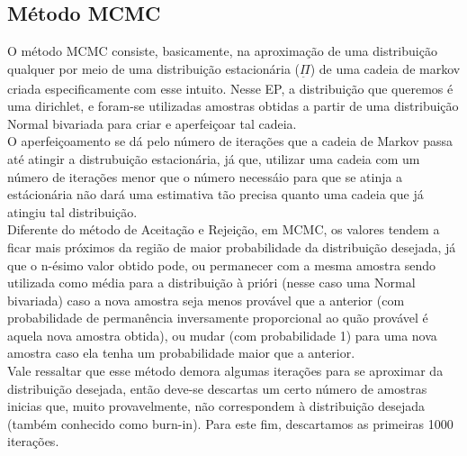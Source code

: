 \documentclass{article}
\newcommand{\undertilde}[1]{\underset{\widetilde{}}{#1}}
\begin{document}
\subsection{Método MCMC}

    O método MCMC consiste, basicamente, na aproximação de uma distribuição qualquer por meio de uma distribuição estacionária (\textbf{$\undertilde{\Pi}$}) de uma cadeia de markov criada especificamente com esse intuito. Nesse EP, a distribuição que queremos é uma dirichlet, e foram-se utilizadas amostras obtidas a partir de uma distribuição Normal bivariada para criar e aperfeiçoar tal cadeia.\\
    
    O aperfeiçoamento se dá pelo número de iterações que a cadeia de Markov passa até atingir a distrubuição estacionária, já que, utilizar uma cadeia com um número de iterações menor que o número necessáio para que se atinja a estácionária não dará uma estimativa tão precisa quanto uma cadeia que já atingiu tal distribuição.\\
    
    Diferente do método de Aceitação e Rejeição, em MCMC, os valores tendem a ficar mais próximos da região de maior probabilidade da distribuição desejada, já que o n-ésimo valor obtido pode, ou permanecer com a mesma amostra sendo utilizada como média para a distribuição à prióri (nesse caso uma Normal bivariada) caso a nova amostra seja menos provável que a anterior (com probabilidade de permanência inversamente proporcional ao quão provável é aquela nova amostra obtida), ou mudar (com probabilidade 1) para uma nova amostra caso ela tenha um probabilidade maior que a anterior. \\
    
    Vale ressaltar que esse método demora algumas iterações para se aproximar da distribuição desejada, então deve-se descartas um certo número de amostras inicias que, muito provavelmente, não correspondem à distribuição desejada (também conhecido como burn-in). Para este fim, descartamos as primeiras 1000 iterações.
\end{document}
